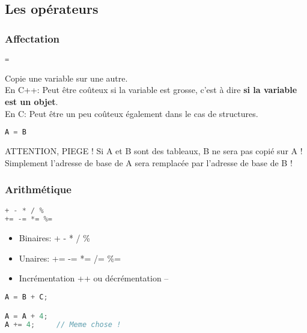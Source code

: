 \documentclass{beamer}
\begin{document}
\subsection{Les opérateurs}
\begin{frame}[fragile=singleslide,shrink=20]
\frametitle{Affectation}
\begin{lstlisting}[language=c++]
=
\end{lstlisting}

Copie une variable sur une autre. \\
En C++: Peut être coûteux si la variable est grosse, c'est à dire \textbf{si la variable est un objet}. \\
En C: Peut être un peu coûteux également dans le cas de structures.

\begin{lstlisting}[language=c++]
A = B
\end{lstlisting}

\begin{block}{ATTENTION, PIEGE !}
Si A et B sont des tableaux, B ne sera pas copié sur A ! \\
Simplement l'adresse de base de A sera remplacée par l'adresse de base de B ! \\
\end{block}
\end{frame}

\begin{frame}[fragile=singleslide,shrink=20]
\frametitle{Arithmétique}
\begin{lstlisting}[language=c++]
+ - * / %
+= -= *= %=
\end{lstlisting}

\begin{itemize}
\item{Binaires: + - * / \%}
\item{Unaires: += -= *= /= \%=}
\item{Incrémentation ++ ou décrémentation --}
\end{itemize}

\begin{lstlisting}[language=c++]
A = B + C;

A = A + 4;
A += 4;     // Meme chose !
\end{lstlisting}
\end{frame}
\end{document}
